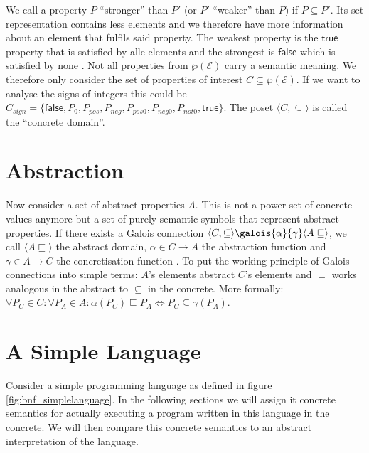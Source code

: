 We call a property $P$ ``stronger'' than $P'$ (or $P'$ ``weaker'' than $P$) if $P\subseteq P'$. Its set representation contains less elements and we therefore have more information about an element that fulfils said property. The weakest property is the $\mathsf{true}$ property that is satisfied by alle elements and the strongest is $\mathsf{false}$ which is satisfied by none \cite[chapter 8]{cousot2021}. Not all properties from $\wp(\mathcal{E})$ carry a semantic meaning. We therefore only consider the set of properties of interest $C\subseteq\wp(\mathcal{E})$. If we want to analyse the signs of integers this could be $C_{sign}=\{\mathsf{false}, P_{0}, P_{pos}, P_{neg}, P_{pos0}, P_{neg0}, P_{not0}, \mathsf{true}\}$. The poset  $\langle C,\subseteq\rangle$ is called the ``concrete domain''.

\section{Abstraction}

Now consider a set of abstract properties $A$. This is not a power set of concrete values anymore but a set of purely semantic symbols that represent abstract properties. If there exists a Galois connection $\langle C,\subseteq\rangle \galois{\alpha}{\gamma}\langle A\sqsubseteq\rangle$, we call $\langle A\sqsubseteq\rangle$ the abstract domain, $\alpha\in C\to A$ the abstraction function and $\gamma\in A\to C$ the concretisation function \cite[chapter 11]{cousot2021}. To put the working principle of Galois connections into simple terms: $A$'s elements abstract $C$'s elements and $\sqsubseteq$ works analogous in the abstract to $\subseteq$ in the concrete. More formally: $\forall P_C\in C:\forall P_A \in A:\alpha(P_C)\sqsubseteq P_A \Longleftrightarrow P_C \subseteq \gamma(P_A)$.



\section{A Simple Language}

Consider a simple programming language as defined in figure \ref{fig:bnf_simplelanguage}. In the following sections we will assign it concrete semantics for actually executing a program written in this language in the concrete. We will then compare this concrete semantics to an abstract interpretation of the language.




